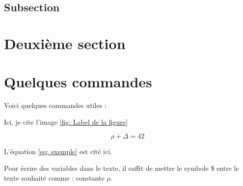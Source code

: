 \documentclass{rapportECL}
\begin{document}
\lipsum[3-4]%

\subsection{Subsection}

\lipsum[3-4] %

\section{Deuxième section}

\lipsum[3-5] %


\section{Quelques commandes}

Voici quelques commandes utiles :


Ici, je cite l'image \ref{fig: Label de la figure}



\begin{equation} \label{eq: exemple}
\rho + \Delta = 42
\end{equation}

L'équation \ref{eq: exemple} est cité ici. 


Pour écrire des variables dans le texte, il suffit de mettre le symbole \$ entre le texte souhaité comme : constante $\rho$. 
\end{document}
